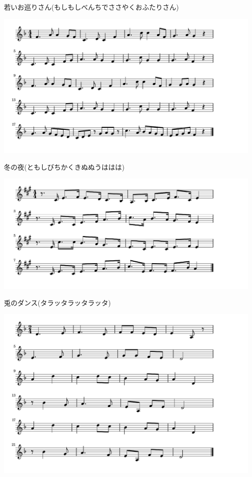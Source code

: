 \documentclass[a4paper]{ltjsarticle}
\begin{document}
\vspace{-10mm} \hspace{10mm}
若いお巡りさん(もしもしべんちでささやくおふたりさん)

\includegraphics[clip]{fuyunoyoru_crop.pdf}

\vspace{-10mm} \hspace{10mm}
冬の夜(ともしびちかくきぬぬうははは)

\includegraphics[clip]{usaginodance_crop.pdf}

\vspace{-10mm} \hspace{10mm}
兎のダンス(タラッタラッタラッタ)

\includegraphics[clip]{katyusha_crop.pdf}
\end{document}

